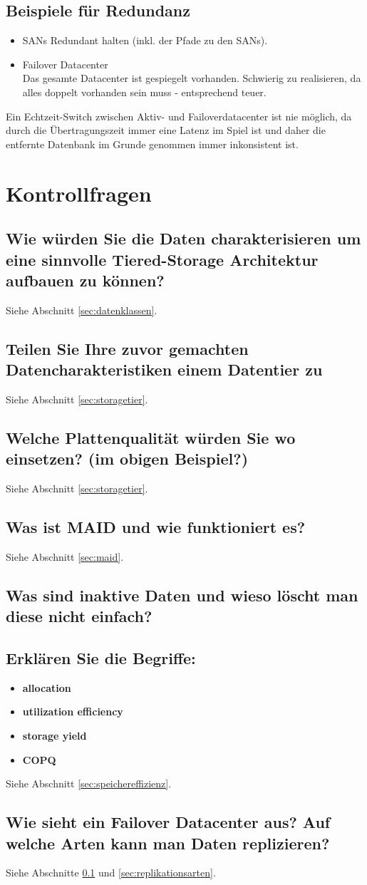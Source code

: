 \subsection{Beispiele für Redundanz}\label{sec:bsp_redundanz}
\begin{itemize}
	\item SANs Redundant halten (inkl. der Pfade zu den SANs).
	\item Failover Datacenter \\ 
		Das gesamte Datacenter ist gespiegelt vorhanden. Schwierig zu realisieren, da alles doppelt vorhanden sein muss - entsprechend teuer.
\end{itemize}
Ein Echtzeit-Switch zwischen Aktiv- und Failoverdatacenter ist nie möglich, da durch die Übertragungszeit immer eine Latenz im Spiel ist und daher die entfernte Datenbank im Grunde genommen immer inkonsistent ist.
\section{Kontrollfragen}
\subsection{Wie würden Sie die Daten charakterisieren um eine sinnvolle Tiered-Storage Architektur aufbauen zu können?}
Siehe Abschnitt \ref{sec:datenklassen}.
\subsection{Teilen Sie Ihre zuvor gemachten Datencharakteristiken einem Datentier zu}
Siehe Abschnitt \ref{sec:storagetier}.
\subsection{Welche Plattenqualität würden Sie wo einsetzen? (im obigen Beispiel?)}
Siehe Abschnitt \ref{sec:storagetier}.
\subsection{Was ist MAID und wie funktioniert es?}
Siehe Abschnitt \ref{sec:maid}.
\subsection{Was sind inaktive Daten und wieso löscht man diese nicht einfach?}
\subsection{Erklären Sie die Begriffe:}
\begin{itemize}
	\item \textbf{allocation} \\
	\item \textbf{utilization efficiency} \\
	\item \textbf{storage yield} \\
	\item \textbf{COPQ} \\
\end{itemize}
Siehe Abschnitt \ref{sec:speichereffizienz}.
\subsection{Wie sieht ein Failover Datacenter aus? Auf welche Arten kann man Daten replizieren?}
Siehe Abschnitte \ref{sec:bsp_redundanz} und \ref{sec:replikationsarten}.
